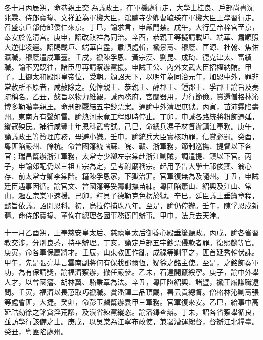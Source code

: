 \begin{pinyinscope}
冬十月丙辰朔，命恭親王奕為議政王，在軍機處行走，大學士桂良、戶部尚書沈兆霖、侍郎寶鋆、文祥並為軍機大臣，鴻臚寺少卿曹毓瑛在軍機大臣上學習行走。召盛京戶部侍郎倭仁來京。丁巳，諭求言，申嚴門禁。戊午，大行皇帝梓宮至京，奉安於乾清宮。庚申，詔改祺祥為同治。辛酉，恭親王等擬請載垣、端華、肅順照大逆律凌遲。詔賜載垣、端華自盡，肅順處斬，褫景壽、穆廕、匡源、杜翰、焦佑瀛職，穆廕遣戍軍臺。壬戌，褫陳孚恩、黃宗漢、劉昆、成琦、德克津太、富績職。諭不究既往，諸臣毋再請察辦黨援。申誡王公、內外文武大臣招權納賄。甲子，上御太和殿即皇帝位，受朝。頒詔天下，以明年為同治元年，加恩中外，罪非常赦所不原者，咸赦除之。免惇親王、恭親王、醇郡王、鍾郡王、孚郡王諭旨及奏疏稱名。乙丑，懿旨以物力維艱，誡內務府，宮闈器用，力行節儉。賞還僧格林沁博多勒噶臺親王。命刑部覈結五宇鈔票案。通諭中外清理庶獄。丙寅，苗沛霖陷壽州。東南方有聲如雷。諭熱河未竟工程即時停止。丁卯，申誡各路統將粉飾遷延，縱寇殃民。補行咸豐十年恩科武會試。己巳，命總兵馮子材督辦鎮江軍務。庚午，諭議政王等贊理庶務，毋避小嫌。壬申，諭統兵大臣實核功罪，信賞必罰。癸酉，粵匪陷嚴州、餘杭。命曾國籓統轄蘇、皖、贛、浙軍務，節制巡撫、提督以下各官；瑞昌幫辦浙江軍務，太常寺少卿左宗棠赴浙江剿賊，調遣提、鎮以下官。丙子，申諭郊配仍以三祖五宗為定，皇考祔廟稱宗。起用予告大學士祁俊藻、翁心存、前太常寺卿李棠階。籍陳孚恩家，下獄治罪。官軍復無為及隨州。丁丑，申誡廷臣遇事因循。諭官文、曾國籓等妥籌剿撫苗練。粵匪陷蕭山、紹興及江山、常山，趣左宗棠軍速援。己卯，釋貝子德勒克色楞於獄。辛巳，廷臣議上垂簾章程，懿旨依議。詔開恩科。初，烏拉停捕珠八年。至是，諭仍停辦。壬午，陳孚恩戍新疆。命侍郎寶鋆、董恂在總理各國事務衙門辦事。甲申，法兵去天津。

十一月乙酉朔，上奉慈安皇太后、慈禧皇太后御養心殿垂簾聽政。丙戌，諭各省習教交涉，分別良莠，持平辦理。丁亥，諭定戶部五宇鈔票侵款者罪。復熙麟等官。庚寅，命各軍保薦將才。壬辰，山東教匪作亂，成祿等剿平之，匪首延秀輪伏誅。甲午，先是張亮基言雲南副將何有保戕鄧爾恆，疑徐之銘主使。至是，之銘飾奏軍功，為有保請獎，諭福濟察辦，撤任嚴參。乙未，石達開竄綏寧。庚子，諭中外舉人才，以曾國籓、胡林翼、駱秉章為法。辛丑，粵匪陷紹興、諸暨，褫王履謙職逮問。壬寅，福濟以畏葸取巧褫職。賞潘鐸二品頂戴，署云貴總督。僧格林沁剿壽張等處會匪，大捷。癸卯，命彭玉麟幫辦袁甲三軍務。官軍復來安。乙巳，給事中高延祜劾徐之銘貪淫荒謬，及滇省練黨縱恣。諭潘鐸查辦。丁未，詔各省察舉循良，並訪學行該備之士。庚戌，以吳棠為江寧布政使，兼署漕運總督，督辦江北糧臺。癸丑，粵匪陷處州。


\end{pinyinscope}
